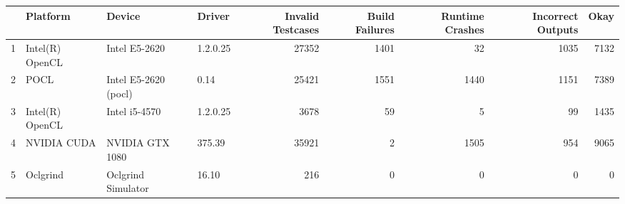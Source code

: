 \begin{tabular}{llllrrrrr}
\toprule
{} &         Platform &                Device &    Driver &  Invalid Testcases &  Build Failures &  Runtime Crashes &  Incorrect Outputs &  Okay \\
\midrule
1 &  Intel(R) OpenCL &         Intel E5-2620 &  1.2.0.25 &              27352 &            1401 &               32 &               1035 &  7132 \\
2 &             POCL &  Intel E5-2620 (pocl) &      0.14 &              25421 &            1551 &             1440 &               1151 &  7389 \\
3 &  Intel(R) OpenCL &         Intel i5-4570 &  1.2.0.25 &               3678 &              59 &                5 &                 99 &  1435 \\
4 &      NVIDIA CUDA &       NVIDIA GTX 1080 &    375.39 &              35921 &               2 &             1505 &                954 &  9065 \\
5 &         Oclgrind &    Oclgrind Simulator &     16.10 &                216 &               0 &                0 &                  0 &     0 \\
\bottomrule
\end{tabular}
